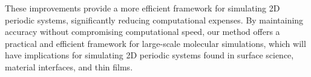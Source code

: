 \documentclass[11pt, a4paper, oneside]{Thesis} %
\begin{document}
{These improvements provide a more efficient framework for simulating 2D periodic systems, significantly reducing computational expenses. By maintaining accuracy without compromising computational speed, our method offers a practical and efficient framework for large-scale molecular simulations, which will have implications for simulating 2D periodic systems found in surface science, material interfaces, and thin films.

}




\clearpage %
\clearpage %


\pagestyle{fancy} %

\tableofcontents %

\listoffigures %

\listoftables %

\end{document}
